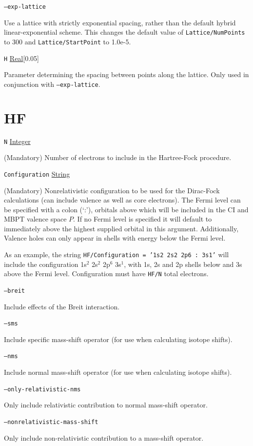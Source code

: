 \documentclass{report}
\begin{document}
\texttt{--exp-lattice}
\begin{adjustwidth}{1cm}{}
Use a lattice with strictly exponential spacing, rather than the default hybrid linear-exponential
scheme. This changes the default value of \texttt{Lattice/NumPoints} to 300 and
\texttt{Lattice/StartPoint} to 1.0e-5.
\end{adjustwidth}

\texttt{H} \uline{Real}[0.05]
\begin{adjustwidth}{1cm}{}
Parameter determining the spacing between points along the lattice. Only used in conjunction with
\texttt{--exp-lattice}.
\end{adjustwidth}

\section{HF}

\texttt{N} \uline{Integer}
\begin{adjustwidth}{1cm}{}
(Mandatory) Number of electrons to include in the Hartree-Fock procedure.
\end{adjustwidth}
\texttt{Configuration} \uline{String} 
\begin{adjustwidth}{1cm}{}
(Mandatory) Nonrelativistic configuration to be used for the
Dirac-Fock calculations (can include valence as well as core electrons). The Fermi level can be specified
with a colon (`:'), orbitals above which will be included in the CI and MBPT valence space $P$. If no
Fermi level is specified it will default to immediately above the highest supplied orbital in this
argument. Additionally, Valence holes can only appear in shells with energy below the Fermi level.
                                                                               
As an example, the string \texttt{HF/Configuration = '1s2 2s2 2p6~:~3s1'} will include the configuration
1s$^2$ 2s$^2$ 2p$^6$ 3s$^1$, with 1s, 2s and 2p shells below and 3s above the Fermi level.
Configuration must have \texttt{HF/N} total electrons.
\end{adjustwidth}

\texttt{--breit} 
\begin{adjustwidth}{1cm}{}
Include effects of the Breit interaction.
\end{adjustwidth}
\texttt{--sms} 
\begin{adjustwidth}{1cm}{}
Include specific mass-shift operator (for use when calculating isotope shifts).
\end{adjustwidth}
\texttt{--nms} 
\begin{adjustwidth}{1cm}{}
Include normal mass-shift operator (for use when calculating isotope shifts).
\end{adjustwidth}
\texttt{--only-relativistic-nms} 
\begin{adjustwidth}{1cm}{}
Only include relativistic contribution to normal mass-shift operator.
\end{adjustwidth}
\texttt{--nonrelativistic-mass-shift}
\begin{adjustwidth}{1cm}{}
Only include non-relativistic contribution to a mass-shift operator.
\end{adjustwidth}
\end{document}
